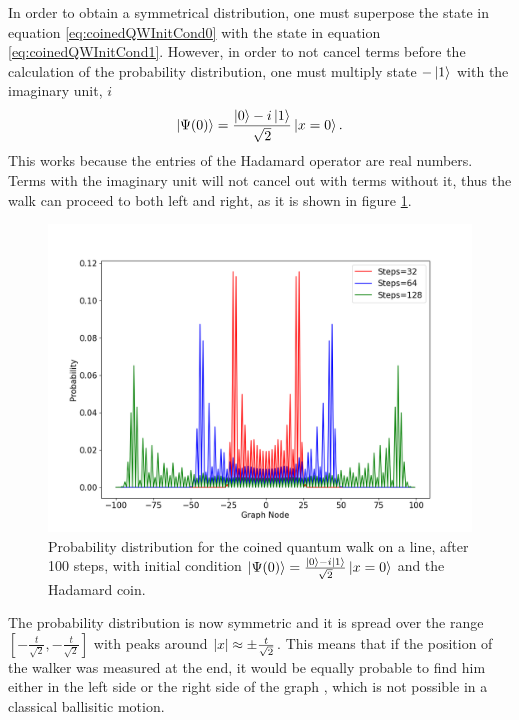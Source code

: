 \documentclass[../../dissertation.tex]{subfiles}
\begin{document}
In order to obtain a symmetrical distribution, one must superpose the state in equation \ref{eq:coinedQWInitCond0} with the state in equation \ref{eq:coinedQWInitCond1}. However, in order to not cancel terms before the calculation of the probability distribution, one must multiply state $-\ket{1}$ with the imaginary unit, $i$ 
\begin{equation}
	\ket{\Psi(0)} = \frac{\ket{0}-i\ket{1}}{\sqrt{2}}\ket{x=0}.
	\label{eq:12}
\end{equation}
This works because the entries of the Hadamard operator are real numbers. Terms with the imaginary unit will not cancel out with terms without it, thus the walk can proceed to both left and right, as it is shown in figure \ref{fig:coinedQWDist01}. 
\begin{figure}[!ht]
	\centering
	\includegraphics[scale=0.40]{img/CoinedQuantumWalk/CoinedMultiple_psi01_3264128}
	\caption{Probability distribution for the coined quantum walk on a line, after 100 steps, with initial condition $\ket{\Psi(0)}=\frac{\ket{0}-i\ket{1}}{\sqrt{2}}\ket{x=0}$ and the Hadamard coin.} 
	\label{fig:coinedQWDist01}
\end{figure}\par
The probability distribution is now symmetric and it is spread over the range $[-\frac{t}{\sqrt{2}},-\frac{t}{\sqrt{2}}]$ with peaks around $\abs{x} \approx \pm \frac{t}{\sqrt{2}}$. This means that if the position of the walker was measured at the end, it would be equally probable to find him either in the left side or the right side of the graph , which is not possible in a classical ballisitic motion.\par
\end{document}
